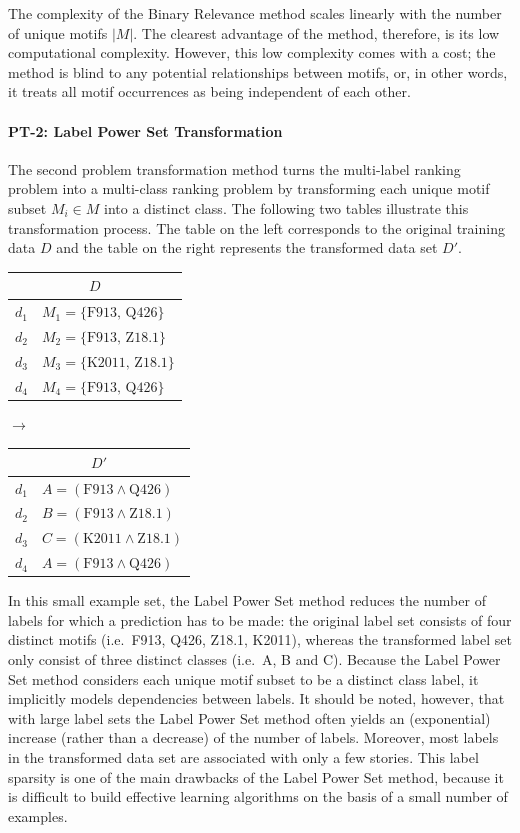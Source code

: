 The complexity of the Binary Relevance method scales linearly with the number of unique motifs $|M|$. The clearest advantage of the method, therefore, is its low computational complexity. However, this low complexity comes with a cost; the method is blind to any potential relationships between motifs, or, in other words, it treats all motif occurrences as being independent of each other. 

\paragraph{PT-2: Label Power Set Transformation}

The second problem transformation method turns the multi-label ranking problem into a multi-class ranking problem by transforming each unique motif subset $M_i \in M$ into a distinct class. The following two tables illustrate this transformation process. The table on the left corresponds to the original training data $D$ and the table on the right represents the transformed data set $D'$.

\begin{table}[h]
\centering
\begin{tabular}{ll}
\multicolumn{2}{c}{$D$} \\
\toprule
$d_1$ & $M_1 = \{ \text{F913, Q426}\}$ \\
$d_2$ & $M_2 = \{ \text{F913, Z18.1}\}$ \\
$d_3$ & $M_3 = \{ \text{K2011, Z18.1}\}$ \\
$d_4$ & $M_4 = \{ \text{F913, Q426}\}$ \\
\bottomrule
\end{tabular}
\quad$\rightarrow$\quad
\begin{tabular}{ll}
\multicolumn{2}{c}{$D'$} \\
\toprule
$d_1$ & $A = (\text{F913} \land \text{Q426})$ \\
$d_2$ & $B = (\text{F913} \land \text{Z18.1})$ \\
$d_3$ & $C = (\text{K2011} \land \text{Z18.1})$ \\
$d_4$ & $A = (\text{F913} \land \text{Q426})$ \\
\bottomrule
\end{tabular}
\end{table}

\noindent In this small example set, the Label Power Set method reduces the number of labels for which a prediction has to be made: the original label set consists of four distinct motifs (i.e.\ F913, Q426, Z18.1, K2011), whereas the transformed label set only consist of three distinct classes (i.e.\ A, B and C). Because the Label Power Set method considers each unique motif subset to be a distinct class label, it implicitly models dependencies between labels. It should be noted, however, that with large label sets the Label Power Set method often yields an (exponential) increase (rather than a decrease) of the number of labels. Moreover, most labels in the transformed data set are associated with only a few stories. This label sparsity is one of the main drawbacks of the Label Power Set method, because it is difficult to build effective learning algorithms on the basis of a small number of examples.

